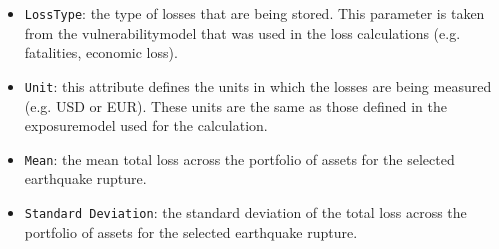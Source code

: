 \begin{itemize}

  \item \Verb+LossType+: the type of losses that are being stored. This
    parameter is taken from the \gls{vulnerabilitymodel} that was used in the
    loss calculations (e.g. fatalities, economic loss).

  \item \Verb+Unit+: this attribute defines the units in which the losses are
    being measured (e.g. USD or EUR). These units are the same as those defined
    in the \gls{exposuremodel} used for the calculation.

  \item \Verb+Mean+: the mean total loss across the portfolio of assets for the
    selected earthquake rupture.

  \item \Verb+Standard Deviation+: the standard deviation of the total loss 
    across the portfolio of assets for the selected earthquake rupture.

\end{itemize} 